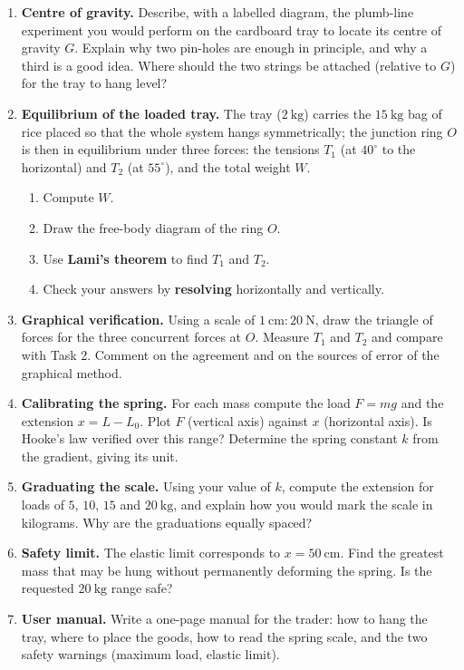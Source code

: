 \documentclass[11pt]{article}
\begin{document}
\begin{enumerate}
\item \textbf{Centre of gravity.} Describe, with a labelled diagram, the plumb-line experiment you would perform on the cardboard tray to locate its centre of gravity $G$. Explain why two pin-holes are enough in principle, and why a third is a good idea. Where should the two strings be attached (relative to $G$) for the tray to hang level?
\item \textbf{Equilibrium of the loaded tray.} The tray ($2\ \mathrm{kg}$) carries the $15\ \mathrm{kg}$ bag of rice placed so that the whole system hangs symmetrically; the junction ring $O$ is then in equilibrium under three forces: the tensions $T_1$ (at $40^{\circ}$ to the horizontal) and $T_2$ (at $55^{\circ}$), and the total weight $W$.
\begin{enumerate}
\item Compute $W$.
\item Draw the free-body diagram of the ring $O$.
\item Use \textbf{Lami's theorem} to find $T_1$ and $T_2$.
\item Check your answers by \textbf{resolving} horizontally and vertically.
\end{enumerate}
\item \textbf{Graphical verification.} Using a scale of $1\ \mathrm{cm} : 20\ \mathrm{N}$, draw the triangle of forces for the three concurrent forces at $O$. Measure $T_1$ and $T_2$ and compare with Task 2. Comment on the agreement and on the sources of error of the graphical method.
\item \textbf{Calibrating the spring.} For each mass compute the load $F = mg$ and the extension $x = L - L_0$. Plot $F$ (vertical axis) against $x$ (horizontal axis). Is Hooke's law verified over this range? Determine the spring constant $k$ from the gradient, giving its unit.
\item \textbf{Graduating the scale.} Using your value of $k$, compute the extension for loads of $5$, $10$, $15$ and $20\ \mathrm{kg}$, and explain how you would mark the scale in kilograms. Why are the graduations equally spaced?
\item \textbf{Safety limit.} The elastic limit corresponds to $x = 50\ \mathrm{cm}$. Find the greatest mass that may be hung without permanently deforming the spring. Is the requested $20\ \mathrm{kg}$ range safe?
\item \textbf{User manual.} Write a one-page manual for the trader: how to hang the tray, where to place the goods, how to read the spring scale, and the two safety warnings (maximum load, elastic limit).
\end{enumerate}
\end{document}
